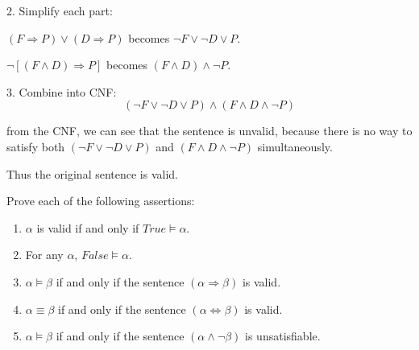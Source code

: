 \documentclass[cn,12pt]{homework}
\begin{document}
\begin{solution}
2. Simplify each part:

\((F \Rightarrow P) \lor (D \Rightarrow P)\) becomes \(\neg F \lor \neg D \lor P\).


\(\neg \left[ (F \land D) \Rightarrow P \right]\) becomes \((F \land D) \land \neg P\).

3. Combine into CNF:
\[
(\neg F \lor \neg D \lor P) \land (F \land D \land \neg P)
\]

from the CNF, we can see that the sentence is unvalid, because there is no way to satisfy both \((\neg F \lor \neg D \lor P)\) and \((F \land D \land \neg P)\) simultaneously.

Thus the original sentence is valid.
\end{solution}


\newpage




\begin{problem}
\quad

Prove each of the following assertions:
\begin{enumerate}
    \item[(a)] $\alpha$ is valid if and only if $True \models \alpha$.
    \item[(b)] For any $\alpha$, $False \models \alpha$.
    \item[(c)] $\alpha \models \beta$ if and only if the sentence $(\alpha \Rightarrow \beta)$ is valid.
    \item[(d)] $\alpha \equiv \beta$ if and only if the sentence $(\alpha \Leftrightarrow \beta)$ is valid.
    \item[(e)] $\alpha \models \beta$ if and only if the sentence $(\alpha \land \neg \beta)$ is unsatisfiable.
\end{enumerate}

\end{problem}
\end{document}
